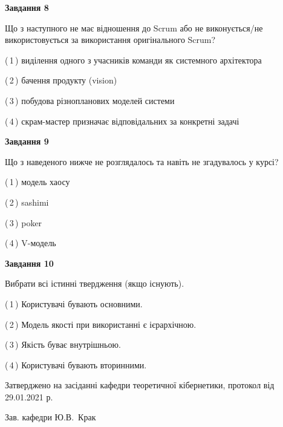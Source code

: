 \documentclass[10pt, ukrainian]{article}
\begin{document}
{\begin {large}
{\begin {center}\textbf{Завдання 8}\end {center}}\par
Що з наступного не має відношення до Scrum або не виконується/не використовується за використання оригінального Scrum?\par
\vspace{2mm}



(\,1\,) виділення одного з учасників команди як системного архітектора%



(\,2\,) бачення продукту (vision) %



(\,3\,) побудова різнопланових моделей системи%



(\,4\,) скрам-мастер призначає відповідальних за конкретні задачі%


{\begin {center}\textbf{Завдання 9}\end {center}}\par
Що з наведеного нижче не розглядалось та навіть не згадувалось у курсі?\par
\vspace{2mm}



(\,1\,) модель хаосу%



(\,2\,) sashimi%



(\,3\,) poker%



(\,4\,) V-модель%


{\begin {center}\textbf{Завдання 10}\end {center}}\par
Вибрати всі істинні твердження (якщо існують).\par
\vspace{2mm}



(\,1\,) Користувачі бувають основними.%



(\,2\,) Модель якості при використанні є ієрархічною.%



(\,3\,) Якість буває внутрішньою.%



(\,4\,) Користувачі бувають вторинними.%



\end {large}}
{\vspace{5mm}\smallskip \begin {small} Затверджено на засіданні кафедри теоретичної кібернетики, протокол  від   29.01.2021 р.\par\smallskip\smallskip
{\parbox {6.5 cm}{Зав. кафедри \dotfill Ю.В.~Крак}} \end{small}}
\newpage
\end{document}
